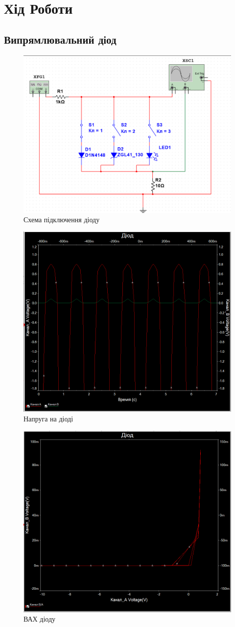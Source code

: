 \documentclass[
  ukrainian,
  14pt
]{extreport}
\begin{document}
\section{Хід Роботи}

\subsection{Випрямлювальний діод}
\begin{figure}[H]
    \centering
    \includegraphics[width=.6\textwidth]{imgs/D-1.png}
    \caption{Схема підключення діоду}
\end{figure}
\begin{figure}[H]
    \centering
    \includegraphics[width=.6\textwidth]{imgs/D-2.png}
    \caption{Напруга на діоді}
\end{figure}
\begin{figure}[H]
    \centering
    \includegraphics[width=.6\textwidth]{imgs/D-3.png}
    \caption{ВАХ діоду}
\end{figure}
\end{document}
